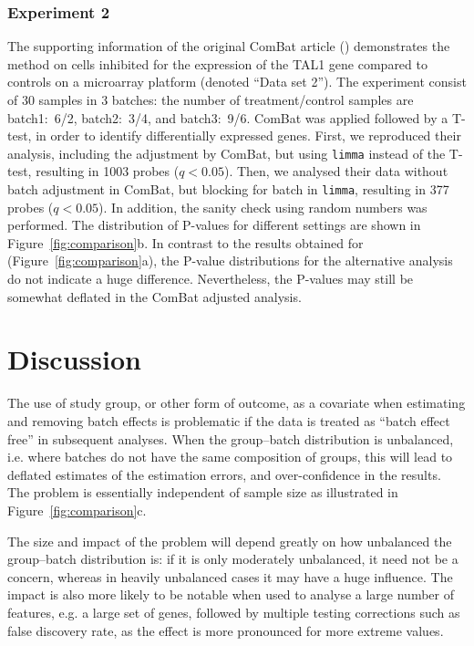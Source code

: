 \documentclass{bio}
\begin{document}
\subsubsection{Experiment 2}

The supporting information of the original ComBat article (\citealp{Johnson2007}) demonstrates the method on cells inhibited for the expression of the TAL1 gene compared to controls on a microarray platform (denoted ``Data set 2''). The experiment consist of 30 samples in 3 batches: the number of treatment/control samples are batch1:~6/2, batch2:~3/4, and batch3:~9/6. ComBat was applied followed by a T-test, in order to identify differentially expressed genes. First, we reproduced their analysis, including the adjustment by ComBat, but using \texttt{limma} instead of the T-test, resulting in 1003 probes ($q<0.05$).  Then, we analysed their data without batch adjustment in ComBat, but blocking for batch in \texttt{limma}, resulting in 377 probes ($q<0.05$). In addition, the sanity check using random numbers was performed. The distribution of P-values for different settings are shown in Figure~\ref{fig:comparison}b. In contrast to the results obtained for \citet{Towfic2014} (Figure~\ref{fig:comparison}a), the P-value distributions for the alternative analysis do not indicate a huge difference. Nevertheless, the P-values may still be somewhat deflated in the ComBat adjusted analysis.


\section{Discussion}

The use of study group, or other form of outcome, as a covariate when estimating and removing batch effects is problematic if the data is treated as ``batch effect free'' in subsequent analyses. When the group--batch distribution is unbalanced, i.e. where batches do not have the same composition of groups, this will lead to deflated estimates of the estimation errors, and over-confidence in the results. The problem is essentially independent of sample size as illustrated in Figure~\ref{fig:comparison}c.

The size and impact of the problem will depend greatly on how unbalanced the group--batch distribution is: if it is only moderately unbalanced, it need not be a concern, whereas in heavily unbalanced cases it may have a huge influence. The impact is also more likely to be notable when used to analyse a large number of features, e.g. a large set of genes, followed by multiple testing corrections such as false discovery rate, as the effect is more pronounced for more extreme values.
\end{document}
